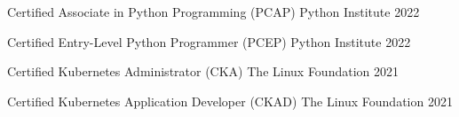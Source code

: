 

\begin{cvhonors}

  \cvhonor
    {Certified Associate in Python Programming (PCAP)} %
    {Python Institute} %
    {} %
    {2022} %

  \cvhonor
    {Certified Entry-Level Python Programmer (PCEP)} %
    {Python Institute} %
    {} %
    {2022} %

  \cvhonor
    {Certified Kubernetes Administrator (CKA)} %
    {The Linux Foundation} %
    {} %
    {2021} %

  \cvhonor
    {Certified Kubernetes Application Developer (CKAD)} %
    {The Linux Foundation} %
    {} %
    {2021} %

\end{cvhonors}
